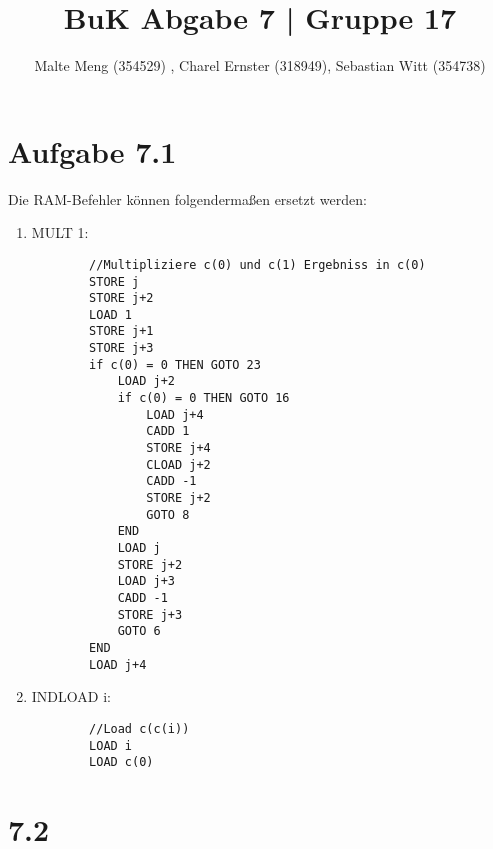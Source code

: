 \documentclass{article}
\title{BuK Abgabe 7 | Gruppe 17}
\author{Malte Meng (354529) , Charel Ernster (318949), Sebastian Witt (354738)}
\begin{document}
	\maketitle 
	\section[a 7.1]{Aufgabe 7.1}
	Die RAM-Befehler können folgendermaßen ersetzt werden:\\
	\begin{enumerate}[label=(\alph*).]
		\item MULT 1:\\
		\lstset{
			numbers=left,
			stepnumber=1,    
			firstnumber=0,
			numberfirstline=false
		}
		\begin{lstlisting}
		//Multipliziere c(0) und c(1) Ergebniss in c(0)
		STORE j
		STORE j+2
		LOAD 1
		STORE j+1
		STORE j+3
		if c(0) = 0 THEN GOTO 23
			LOAD j+2
			if c(0) = 0 THEN GOTO 16
				LOAD j+4
				CADD 1
				STORE j+4
				CLOAD j+2
				CADD -1
				STORE j+2
				GOTO 8
			END
			LOAD j
			STORE j+2
			LOAD j+3
			CADD -1
			STORE j+3
			GOTO 6
		END
		LOAD j+4
		\end{lstlisting}
		\item INDLOAD i:
		\begin{lstlisting}
		//Load c(c(i))
		LOAD i
		LOAD c(0)
		\end{lstlisting}
	\end{enumerate}
	
	\section{7.2}
\end{document}
